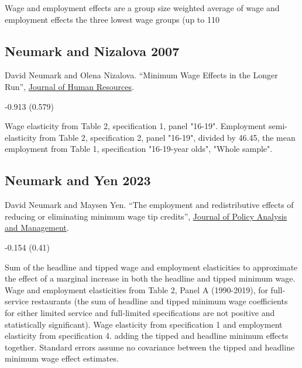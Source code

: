  Wage and employment effects are a group size weighted average of wage and employment effects the three lowest wage groups (up to 110%

\subsection*{Neumark and Nizalova 2007}
\vspace{-0.7em}

\noindent David Neumark and Olena Nizalova. ``Minimum Wage Effects in the Longer Run'', \href{https://doi.org/10.3368/jhr.XLII.2.435}{Journal of Human Resources}.

\vspace{0.7em}

 -0.913 (0.579)

\vspace{0.7em}

 Wage elasticity from Table 2, specification 1, panel "16-19". Employment semi-elasticity from Table 2, specification 2, panel "16-19", divided by 46.45, the mean employment from Table 1, specification "16-19-year olds", "Whole sample".

\subsection*{Neumark and Yen 2023}
\vspace{-0.7em}

\noindent David Neumark and Maysen Yen. ``The employment and redistributive effects of reducing or eliminating minimum wage tip credits'', \href{https://doi.org/10.1002/pam.22450}{Journal of Policy Analysis and Management}.

\vspace{0.7em}

 -0.154 (0.41)

\vspace{0.7em}

 Sum of the headline and tipped wage and employment elasticities to approximate the effect of a marginal increase in both the headline and tipped minimum wage. Wage and employment elasticities from Table 2, Panel A (1990-2019), for full-service restaurants (the sum of headline and tipped minimum wage coefficients for either limited service and full-limited specifications are not positive and statistically significant). Wage elasticity from specification 1 and employment elasticity from specification 4. adding the tipped and headline minimum effects together. Standard errors assume no covariance between the tipped and headline minimum wage effect estimates.

